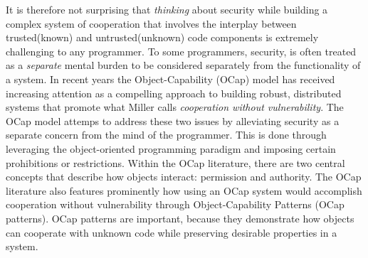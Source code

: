 \documentclass[a4paper,11pt,twoside]{article}
\begin{document}
It is therefore not surprising that \textit{thinking} about security while building a complex system of cooperation that involves the interplay between trusted(known) and untrusted(unknown) code components is extremely challenging to any programmer. To some programmers, security, is often treated as a \textit{separate} mental burden to be considered separately from the functionality of a system. In recent years the Object-Capability (OCap) model has received increasing attention as a compelling approach to building robust, distributed systems that promote what Miller\cite{miller2006} calls \textit{cooperation without vulnerability}. The OCap model attemps to address these two issues by alleviating security as a separate concern from the mind of the programmer. This is done through leveraging the object-oriented programming paradigm and imposing certain prohibitions or restrictions. Within the OCap literature, there are two central concepts that describe how objects interact: permission and authority. The OCap literature also features prominently how using an OCap system would accomplish cooperation without vulnerability through Object-Capability Patterns (OCap patterns). OCap patterns are important, because they demonstrate how objects can cooperate with unknown code while preserving desirable properties in a system.\\
\end{document}
